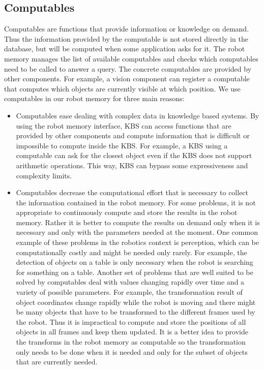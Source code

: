 \subsection{Computables}
\label{sec:computables}
Computables are functions that provide information or knowledge on
demand. Thus the information provided by the computable is not stored
directly in the database, but will be computed when some application
asks for it. The robot memory manages the list of available
computables and checks which computables need to be called to answer a
query. The concrete computables are provided by other components. For
example, a vision component can register a computable that computes
which objects are currently visible at which position. We use
computables in our robot memory for three main reasons:
\begin{itemize}
\item Computables ease dealing with complex data in knowledge based
  systems. By using the robot memory interface, KBS can access
  functions that are provided by other components and compute
  information that is difficult or impossible to compute inside the
  KBS. For example, a KBS using a computable can ask for the closest
  object even if the KBS does not support arithmetic operations. This
  way, KBS can bypass some expressiveness and complexity limits.

\item Computables decrease the computational effort that is necessary
  to collect the information contained in the robot memory. For some
  problems, it is not appropriate to continuously compute and store
  the results in the robot memory. Rather it is better to compute the
  results on demand only when it is necessary and only with the
  parameters needed at the moment. One common example of these
  problems in the robotics context is perception, which can be
  computationally costly and might be needed only rarely. For example, the
  detection of objects on a table is only necessary when the robot is
  searching for something on a table. Another set of problems that
  are well suited to be solved by computables deal with values
  changing rapidly over time and a variety of possible
  parameters. For example, the transformation result of object
  coordinates change rapidly while the robot is moving and there might
  be many objects that have to be transformed to the different frames
  used by the robot. Thus it is impractical to compute and store the
  positions of all objects in all frames and keep
  them updated. It is a better idea to provide the transforms in the
  robot memory as computable so the transformation only needs to
  be done when it is needed and only for the subset of objects that are
  currently needed.


\end{itemize}
